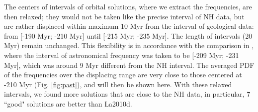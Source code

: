 \documentclass[12pt]{article}
\begin{document}
	The centers of intervals of orbital solutions, where we extract the frequencies, are then relaxed; they would not be taken like the precise interval of NH data, but are rather displaced  within maximum 10 Myr from the interval of geological data: from [-190 Myr; -210 Myr] until [-215 Myr; -235 Myr]. The length of intervals  (20 Myr) remain unchanged. This flexibility is in accordance with the comparison in \citep{olsen2019}, where the interval of astronomical frequency was taken to be [-209 Myr; -231 Myr], which was around 9 Myr different from the NH interval. The averaged PDF of the frequencies over the displacing range are very close to those centered at -210 Myr (Fig. \ref{fig:past}), and will then be shown here. With these relaxed intervals, we found more solutions that are close to the NH data, in particular, 7 ``good" solutions are better than La2010d.
	
\end{document}
